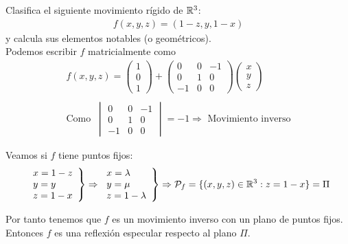 \documentclass[12pt]{article}
\begin{document}
    \begin{ejercicio}[4 puntos]
        Clasifica el siguiente movimiento rígido de $\mathbb{R}^3$:
        \begin{gather*}
            f(x,y,z)=(1-z,y,1-x)
        \end{gather*}
        y calcula sus elementos notables (o geométricos).\\

        Podemos escribir $f$ matricialmente como
        \begin{gather*}
            f(x,y,z)= 
            \begin{pmatrix}
                1 \\ 0 \\ 1
            \end{pmatrix} +
            \begin{pmatrix}
                0&0&-1\\
                0&1&0\\
                -1&0&0
            \end{pmatrix}
            \begin{pmatrix}
                x\\y\\z
            \end{pmatrix}\\\\
            \text{Como }\  \begin{vmatrix}
                0&0&-1\\
                0&1&0\\
                -1&0&0
            \end{vmatrix}=-1 \Rightarrow \text{ Movimiento inverso}
        \end{gather*}

        Veamos si $f$ tiene puntos fijos:
        \begin{gather*}
            \left.
            \begin{array}{l}
                x=1-z\\
                y=y\\
                z=1-x
            \end{array}
            \right\} \Rightarrow \left.
            \begin{array}{l}
                x=\lambda\\
                y=\mu\\
                z=1-\lambda
            \end{array}
            \right\} \Rightarrow \mathcal{P}_f=\{(x,y,z)\in \mathbb{R}^3: z=1-x\}=\Pi
        \end{gather*}

        Por tanto tenemos que $f$ es un movimiento inverso con un plano de puntos fijos. 
        Entonces $f$ es una reflexión especular respecto al plano $\Pi$.

    \end{ejercicio}
\end{document}
